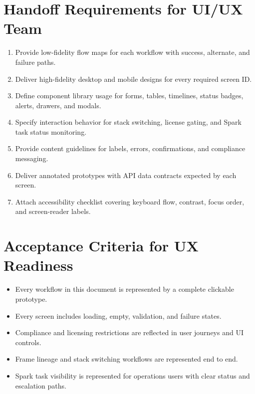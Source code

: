 \documentclass[11pt,a4paper]{article}
\begin{document}
\section{Handoff Requirements for UI/UX Team}

\begin{enumerate}[leftmargin=*]
    \item Provide low-fidelity flow maps for each workflow with success, alternate, and failure paths.
    \item Deliver high-fidelity desktop and mobile designs for every required screen ID.
    \item Define component library usage for forms, tables, timelines, status badges, alerts, drawers, and modals.
    \item Specify interaction behavior for stack switching, license gating, and Spark task status monitoring.
    \item Provide content guidelines for labels, errors, confirmations, and compliance messaging.
    \item Deliver annotated prototypes with API data contracts expected by each screen.
    \item Attach accessibility checklist covering keyboard flow, contrast, focus order, and screen-reader labels.
\end{enumerate}

\section{Acceptance Criteria for UX Readiness}

\begin{itemize}[leftmargin=*]
    \item Every workflow in this document is represented by a complete clickable prototype.
    \item Every screen includes loading, empty, validation, and failure states.
    \item Compliance and licensing restrictions are reflected in user journeys and UI controls.
    \item Frame lineage and stack switching workflows are represented end to end.
    \item Spark task visibility is represented for operations users with clear status and escalation paths.
\end{itemize}
\end{document}
